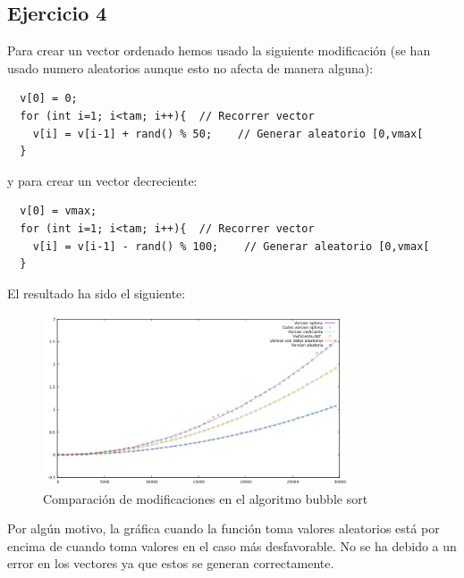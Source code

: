 \subsection*{Ejercicio 4}


Para crear un vector ordenado hemos usado la siguiente modificación (se
han usado numero aleatorios aunque esto no afecta de manera alguna):

\begin{verbatim}
  v[0] = 0;
  for (int i=1; i<tam; i++){  // Recorrer vector
    v[i] = v[i-1] + rand() % 50;    // Generar aleatorio [0,vmax[
  }
\end{verbatim}

y para crear un vector decreciente:

\begin{verbatim}
  v[0] = vmax;
  for (int i=1; i<tam; i++){  // Recorrer vector
    v[i] = v[i-1] - rand() % 100;    // Generar aleatorio [0,vmax[
  }
\end{verbatim}

El resultado ha sido el siguiente:

\begin{figure}[H]
  \caption{Comparación de modificaciones en el algoritmo bubble sort}
  \centering
  \includegraphics[width=0.8\textwidth]{ejer4/comparacion.png}
  \end{figure}

  \begin{flushleft}
    Por algún motivo, la gráfica cuando la función toma valores
    aleatorios está por encima de cuando toma valores en el caso más
    desfavorable. No se ha debido a un error en los vectores ya que
    estos se generan correctamente.
  \end{flushleft}
